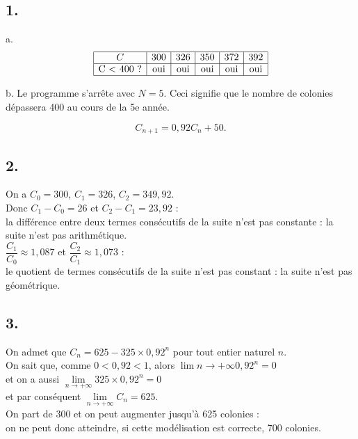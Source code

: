 \subsection*{1.}
	a.	
	\[
	\begin{array}{|c|c|c|c|c|c|}
		\hline
		C & 300 & 326 & 350 & 372 & 392 \\
		\hline
		\text{C < 400 ?} & \text{oui} & \text{oui} & \text{oui} & \text{oui} & \text{oui} \\
		\hline
	\end{array}
	\]
	
	b. Le programme s’arrête avec \(N = 5\). Ceci signifie que le nombre de colonies dépassera 400 au cours de la 5e année.
	
	\[
	C_{n+1} = 0,92 C_n + 50.
	\]
	
	\subsection*{2.}
	

		On a $C_0 = 300$, \quad $C_1 = 326$, \quad $C_2 = 349,92$. \\
Donc  $C_1 - C_0 = 26$  et $C_2 - C_1 = 23,92$ :\\
 la différence entre deux termes consécutifs de la suite n’est pas constante : la suite n’est pas arithmétique. \\
		$\dfrac{C_1}{C_0} \approx 1,087$  et $\dfrac{C_2}{C_1} \approx 1,073$ :\\
		 le quotient de termes consécutifs de la suite n’est pas constant : la suite n’est pas géométrique.

	
	\subsection*{3.}
	
	On admet que \(C_n = 625 - 325 \times 0,92^n\) pour tout entier naturel \(n\).\\
	On sait que, comme \(0 < 0,92 < 1\), alors \(\lim\limits{n \to +\infty} 0,92^n = 0\)\\
	 et on a aussi $\lim\limits_{n \to +\infty} 325 \times 0,92^n = 0$ \\
	 et par conséquent $\lim\limits_{n \to +\infty} C_n = 625$.\\
	 On part de 300 et on peut augmenter jusqu’à 625 colonies :\\ on ne peut donc atteindre, si cette modélisation est correcte, 700 colonies.
